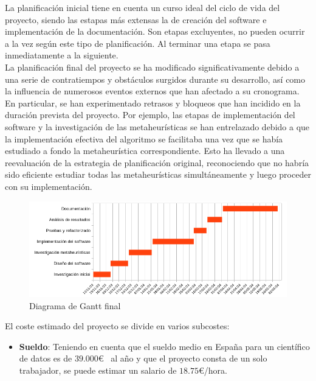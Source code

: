 La planificación inicial tiene en cuenta un curso ideal del ciclo de vida del proyecto, siendo las estapas más extensas la de creación del software e implementación de la documentación. Son etapas excluyentes, no pueden ocurrir a la vez según este tipo de planificación. Al terminar una etapa se pasa inmediatamente a la siguiente.\\[6pt]
La planificación final del proyecto se ha modificado significativamente debido a una serie de contratiempos y obstáculos surgidos durante su desarrollo, así como la influencia de numerosos eventos externos que han afectado a su cronograma. En particular, se han experimentado retrasos y bloqueos que han incidido en la duración prevista del proyecto. Por ejemplo, las etapas de implementación del software y la investigación de las metaheurísticas se han entrelazado debido a que la implementación efectiva del algoritmo se facilitaba una vez que se había estudiado a fondo la metaheurística correspondiente. Esto ha llevado a una reevaluación de la estrategia de planificación original, reconociendo que no habría sido eficiente estudiar todas las metaheurísticas simultáneamente y luego proceder con su implementación.

\begin{figure}[H]
      \begin{center}
      \includegraphics[width=1.2\textwidth]{imagenes/gantt-init.png}
      \end{center}
      \caption{Diagrama de Gantt final}
\end{figure}

El coste estimado del proyecto se divide en varios subcostes:
\begin{itemize}
      \item \textbf{Sueldo}: Teniendo en cuenta que el sueldo medio en España para un científico de datos es de $39.000$€~\cite{payscale_barcelona} al año y que el proyecto consta de un solo trabajador, se puede estimar un salario de $18.75$€/hora. 
\end{itemize}